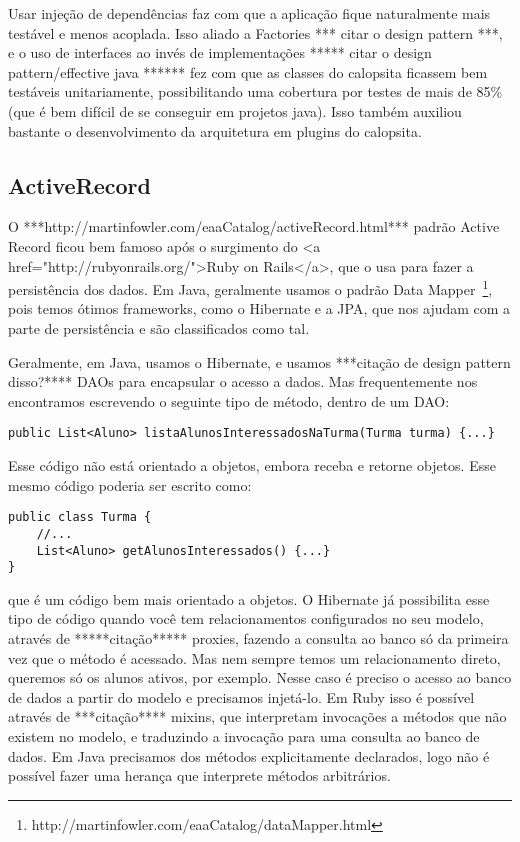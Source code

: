 Usar injeção de dependências faz com que a aplicação fique naturalmente mais testável e menos acoplada. Isso aliado a
Factories *** citar o design pattern ***, e o uso de interfaces ao invés de implementações ***** citar o design 
pattern/effective java ****** fez com que as classes do calopsita ficassem bem testáveis unitariamente, possibilitando 
uma cobertura por testes de mais de 85\% (que é bem difícil de se conseguir em projetos java). Isso também auxiliou bastante
o desenvolvimento da arquitetura em plugins do calopsita.

\subsection{ActiveRecord}

O ***http://martinfowler.com/eaaCatalog/activeRecord.html*** padrão Active Record ficou bem famoso após o 
surgimento do <a href="http://rubyonrails.org/">Ruby on Rails</a>, que o usa para fazer a persistência dos 
dados. Em Java, geralmente usamos o padrão Data Mapper~\footnote{http://martinfowler.com/eaaCatalog/dataMapper.html}, pois temos ótimos frameworks, como o Hibernate e a JPA, que nos ajudam com a parte de persistência e são classificados como tal.

Geralmente, em Java, usamos o Hibernate, e usamos ***citação de design pattern disso?**** DAOs para encapsular 
o acesso a dados. Mas frequentemente nos encontramos escrevendo o seguinte tipo de método, dentro de um DAO:

\begin{lstlisting}
public List<Aluno> listaAlunosInteressadosNaTurma(Turma turma) {...}
\end{lstlisting}

Esse código não está orientado a objetos, embora receba e retorne objetos. Esse mesmo código poderia ser escrito como:

\begin{lstlisting}
public class Turma {
	//...
	List<Aluno> getAlunosInteressados() {...}
}
\end{lstlisting}

que é um código bem mais orientado a objetos. O Hibernate já possibilita esse tipo de código quando você
tem relacionamentos configurados no seu modelo, através de *****citação***** proxies, fazendo a consulta ao banco
só da primeira vez que o método é acessado. Mas nem sempre temos um relacionamento direto, queremos só os alunos
ativos, por exemplo. Nesse caso é preciso o acesso ao banco de dados a partir do modelo e precisamos injetá-lo.
Em Ruby isso é possível através de ***citação**** mixins, que interpretam invocações a métodos que não existem no
modelo, e traduzindo a invocação para uma consulta ao banco de dados. Em Java precisamos dos métodos explicitamente
declarados, logo não é possível fazer uma herança que interprete métodos arbitrários.

